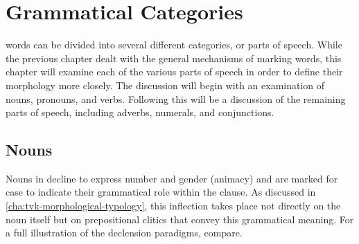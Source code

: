 \chapter{Grammatical Categories}
\label{cha:tvk-grammatical-categories}

\langtvk{} words can be divided into several different categories, or parts of speech. While the previous chapter dealt with the general mechanisms of marking words, this chapter will examine each of the various parts of speech in order to define their morphology more closely. The discussion will begin with an examination of nouns, pronouns, and verbs. Following this will be a discussion of the remaining parts of speech, including adverbs, numerals, and conjunctions.

\section{Nouns}
\label{sec:tvk-nouns}

Nouns in \langtvk{} decline to express number and gender (animacy) and are marked for case to indicate their grammatical role within the clause. As discussed in \autoref{cha:tvk-morphological-typology}, this inflection takes place not directly on the noun itself but on prepositional clitics that convey this grammatical meaning. For a full illustration of the declension paradigms, compare.

